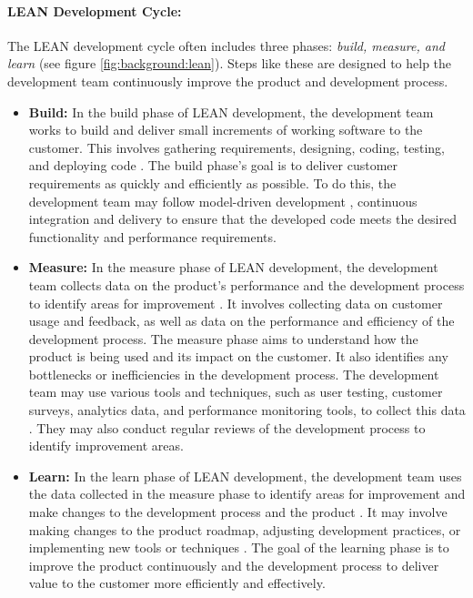 \paragraph*{LEAN Development Cycle:} 
The LEAN development cycle often includes three phases: \textit{build, measure, and learn} (see figure \ref{fig:background:lean}). 
Steps like these are designed to help the development team continuously improve the product and development process.\\
\begin{itemize}
  \item[] \textbf{Build:} In the build phase of LEAN development, the development team works to build and deliver small increments of working software to the customer. This involves gathering requirements, designing, coding, testing, and deploying code \cite{misc:lean:tutorial}. The build phase's goal is to deliver customer requirements as quickly and efficiently as possible. To do this, the development team may follow model-driven development \cite{misc:lean:mdd}, continuous integration and delivery to ensure that the developed code meets the desired functionality and performance requirements.
  \item[] \textbf{Measure:} In the measure phase of LEAN development, the development team collects data on the product's performance and the development process to identify areas for improvement \cite{misc:lean:tutorial}. It involves collecting data on customer usage and feedback, as well as data on the performance and efficiency of the development process. The measure phase aims to understand how the product is being used and its impact on the customer. It also identifies any bottlenecks or inefficiencies in the development process. The development team may use various tools and techniques, such as user testing, customer surveys, analytics data, and performance monitoring tools, to collect this data \cite{article:qqa:young, article:qq:helena}. They may also conduct regular reviews of the development process to identify improvement areas.
  \item[] \textbf{Learn:} In the learn phase of LEAN development, the development team uses the data collected in the measure phase to identify areas for improvement and make changes to the development process and the product \cite{misc:lean:tutorial}. It may involve making changes to the product roadmap, adjusting development practices, or implementing new tools or techniques \cite{article:lean:eric}. The goal of the learning phase is to improve the product continuously and the development process to deliver value to the customer more efficiently and effectively.
\end{itemize}
